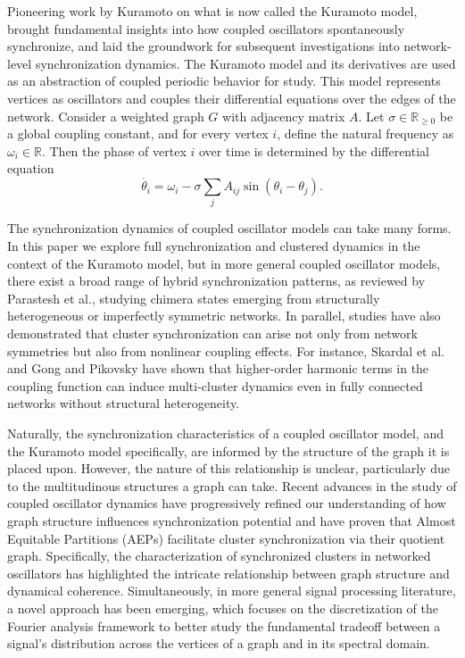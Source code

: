 \documentclass[%
 aip,
 amsmath,amssymb,
preprint,
reprint, onecolumn %
]{revtex4-1}
\newcommand{\R}{\mathbb{R}}
\begin{document}
Pioneering work by Kuramoto\cite{Kuramoto_chem_oscillations} on what is now called the Kuramoto model, brought fundamental insights into how coupled oscillators spontaneously synchronize, and laid the groundwork for subsequent investigations into network-level synchronization dynamics.\cite{strogatz_kuramoto_2000} The Kuramoto model and its derivatives are used as an abstraction of coupled periodic behavior for study. This model represents vertices as oscillators and couples their differential equations over the edges of the network. Consider a weighted graph $G$ with adjacency matrix $A$. Let $\sigma\in \R_{\geq 0}$ be a global coupling constant, and for every vertex $i$, define the natural frequency as $\omega_i\in \R$. Then the phase of vertex $i$ over time is determined by the differential equation
\begin{equation}\label{Kuramoto}
   \dot{\theta_i} = \omega_i - \sigma \sum_{j} A_{ij} \sin(\theta_i-\theta_j).
\end{equation} 

The synchronization dynamics of coupled oscillator models can take many forms. In this paper we explore full synchronization and clustered dynamics in the context of the Kuramoto model, but in more general coupled oscillator models, there exist a broad range of hybrid synchronization patterns, as reviewed by Parastesh et al.,\cite{parastesh2021chimeras} studying chimera states emerging from structurally heterogeneous or imperfectly symmetric networks. In parallel, studies have also demonstrated that cluster synchronization can arise not only from network symmetries but also from nonlinear coupling effects. For instance, Skardal et al.\cite{skardal_cluster_2011} and Gong and Pikovsky\cite{gong_low-dimensional_2019} have shown that higher-order harmonic terms in the coupling function can induce multi-cluster dynamics even in fully connected networks without structural heterogeneity. 

Naturally, the synchronization characteristics of a coupled oscillator model, and the Kuramoto model specifically, are informed by the structure of the graph it is placed upon. However, the nature of this relationship is unclear, particularly due to the multitudinous structures a graph can take. 
Recent advances in the study of coupled oscillator dynamics have progressively refined our understanding of how graph structure influences synchronization potential\cite{nguyen2025communities, schaub_graph_2016, kato_cluster_2023} and have proven that Almost Equitable Partitions (AEPs) facilitate cluster synchronization via their quotient graph. Specifically, the characterization of synchronized clusters in networked oscillators has highlighted the intricate relationship between graph structure and dynamical coherence.\cite{abiad_characterizing_2022, OClery_Observability_2013}
Simultaneously, in more general signal processing literature, a novel approach has been emerging, which focuses on the discretization of the Fourier analysis framework to better study the fundamental tradeoff between a signal's distribution across the vertices of a graph and in its spectral domain.\cite{shuman_emerging_2013}
\end{document}
